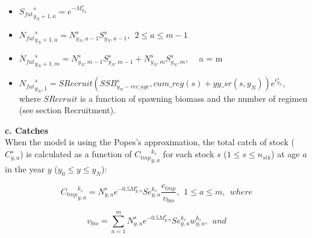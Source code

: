 \documentclass{article}
\begin{document}
\begin{itemize}

    \item ${S_{fut}}^s_{y_N+1,a} = e^{-M^s_{y_N}}$

    \item ${N_{fut}}^s_{y_N+1,a} = N^s_{y_N,a-1}S^s_{y_N,a-1}, \ \ 2\leq a \leq m-1$
    
    \item ${N_{fut}}^s_{y_N+1,m} = N^s_{y_N,m-1}S^s_{y_N,m-1}+N^s_{y_N,m}S^s_{y_N,m}$, \ \ a = m 
    
    \item ${N_{fut}}^s_{y_N,1} = SRecruit(SSB^s_{y_N-rec\_age},cum\_reg(s)+yy\_sr(s,y_N))e^{\epsilon^s_{y_N}}$, where $SRecruit$ is a function of  spawning biomass and the number of regimen (see section Recruitment).
    
\end{itemize}


\hfill

\textbf{c. Catches}\\

When the model is using the Popes's approximation, the total catch of stock ($C^s_{y,a}$) is calculated as a function of ${C_{tmp}}^{k_s}_{y,a}$ for each stock $s$ ($1\leq s \leq n_{stk}$) at age $a$ in the year $y$ ($y_0 \leq y \leq y_N$): 

\begin{equation}
{C_{tmp}}^{k_s}_{y,a}=N^s_{y,a}e^{-0.5M^s_{y,a}} Se_{y,a}^{k_s} \dfrac{c_{tmp}}{v_{bio}}, \ \  1\leq a \leq m, \ \ where
\end{equation}


\begin{equation}
v_{bio}=\sum_{a=1}^mN^s_{y,a}e^{-0.5M^s_{y,a}} Se_{y,a}^{k_s} w_{y,a}^{k_s}, \ \ and 
\end{equation}
    
\end{document}
